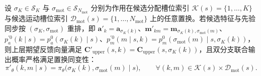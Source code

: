 \begin{lemma}[候选等变双分支策略关于槽位置换的同变性]
设 $\sigma_K\in\mathcal{S}_K$ 与 $\sigma_{\mathrm{mot}}\in\mathcal{S}_{N_{\mathrm{mot}}}$ 分别为作用在候选分配槽位索引 $\mathcal{K}(s)=\{1,\ldots,K\}$ 与候选运动槽位索引 $\mathcal{D}_{\mathrm{mot}}(s)=\{1,\ldots,N_{\mathrm{mot}}\}$ 上的任意置换。若候选特征与先验同步按 $(\sigma_K,\sigma_{\mathrm{mot}})$ 重排，即 $\mathbf{a}'_k=\mathbf{a}_{\sigma_K(k)}$、$\mathbf{m}'_{km}=\mathbf{m}_{\sigma_K(k),\sigma_{\mathrm{mot}}(m)}$、$p_a^{\prime 0}(k\mid s)=p_a^0(\sigma_K(k)\mid s)$、$p_m^{\prime 0}(m\mid s,k)=p_m^0(\sigma_{\mathrm{mot}}(m)\mid s,\sigma_K(k))$，则上层期望反馈向量满足 $\mathbf{C}'_{\mathrm{upper}}(s,k)=\mathbf{C}_{\mathrm{upper}}(s,\sigma_K(k))$，且双分支联合输出概率严格满足置换同变性：
\begin{equation}
    \pi'_\theta(k,m\mid s)=\pi_\theta\big(\sigma_K(k),\sigma_{\mathrm{mot}}(m)\mid s\big),\qquad\forall (k,m)\in\mathcal{K}(s)\times\mathcal{D}_{\mathrm{mot}}(s).
    \label{eq:ch5-permutation-equivariance}
\end{equation}
\end{lemma}

